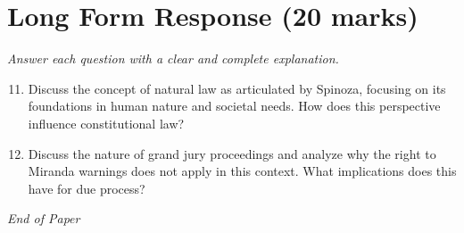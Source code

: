 \documentclass[12pt]{article}
\begin{document}
\section*{Long Form Response (20 marks)}
\textit{Answer each question with a clear and complete explanation.}
\begin{enumerate}[label=\arabic*.]
\setcounter{enumi}{10}
\item Discuss the concept of natural law as articulated by Spinoza, focusing on its foundations in human nature and societal needs. How does this perspective influence constitutional law?
\item Discuss the nature of grand jury proceedings and analyze why the right to Miranda warnings does not apply in this context. What implications does this have for due process?
\end{enumerate}

\vfill
\noindent\textit{End of Paper}
\end{document}
